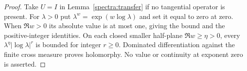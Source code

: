 \documentclass[11pt]{article}
\theoremstyle{definition}
\theoremstyle{remark}
\numberwithin{equation}{section}
\begin{document}
\begin{proof}
Take $U=I$ in Lemma~\ref{spectra:transfer} if no tangential operator
is present.  For $\lambda>0$ put
$\lambda^w=\exp(w\log\lambda)$ and set it equal to zero at zero.
When $\Re w>0$ its absolute value is at most one, giving the bound
and the positive-integer identities.  On each closed smaller
half-plane $\Re w\ge\eta>0$, every
$\lambda^\eta|\log\lambda|^r$ is bounded for integer $r\ge0$.
Dominated differentiation against the finite cross measure proves
holomorphy.  No value or continuity at exponent zero is asserted.
\end{proof}




\end{document}
